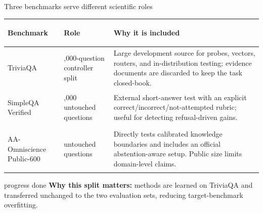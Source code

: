 \documentclass[aspectratio=169,11pt]{beamer}
\begin{document}
\begin{frame}{Three benchmarks serve different scientific roles}
  \footnotesize
  \renewcommand{\arraystretch}{1.12}
  \begin{tabular}{@{}>{\bfseries\raggedright\arraybackslash}p{} >{\raggedright\arraybackslash}p{} >{\raggedright\arraybackslash}p{}@{}}
    \toprule
    Benchmark & Role & Why it is included \\
    \midrule
    TriviaQA & 5,000-question controller split & Large development source for probes, vectors, routers, and in-distribution testing; evidence documents are discarded to keep the task closed-book. \\
    SimpleQA Verified & 1,000 untouched questions & External short-answer test with an explicit correct/incorrect/not-attempted rubric; useful for detecting refusal-driven gains. \\
    AA-Omniscience Public-600 & 600 untouched questions & Directly tests calibrated knowledge boundaries and includes an official abstention-aware setup. Public size limits domain-level claims. \\
    \bottomrule
  \end{tabular}
  \vspace{0.16cm}
  \begin{beamercolorbox}[rounded=true,sep=0.25em]{progress done}
    \textbf{Why this split matters:} methods are learned on TriviaQA and transferred unchanged to the two evaluation sets, reducing target-benchmark overfitting.
  \end{beamercolorbox}
\end{frame}
\end{document}
